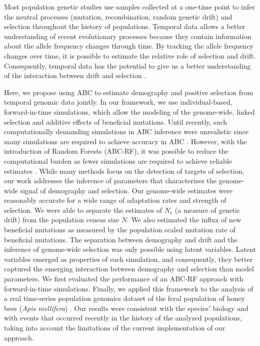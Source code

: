 \documentclass[a4paper, 12pt]{article}
\begin{document}
Most population genetic studies use samples collected at a one-time point to infer the neutral processes (mutation, recombination, random genetic drift) and selection throughout the history of populations. Temporal data allows a better understanding of recent evolutionary processes \citep[e.g.][]{Feder:2021bt, Dehasque:2020ku} because they contain information about the allele frequency changes through time. By tracking the allele frequency changes over time, it is possible to estimate the relative role of selection and drift. Consequently, temporal data has the potential to give us a better understanding of the interaction between drift and selection \citep[see for example,][]{Buffalo:2019ab, Buffalo:2020hq}. 

Here, we propose using ABC to estimate demography and positive selection from temporal genomic data jointly. In our framework, we use individual-based, forward-in-time simulations, which allow the modeling of the genome-wide, linked selection and additive effects of beneficial mutations. Until recently, such computationally demanding simulations in ABC inference were unrealistic since many simulations are required to achieve accuracy in ABC \citep{Frazier:2018kq}. However, with the introduction of Random Forests (ABC-RF), it was possible to reduce the computational burden as fewer simulations are required to achieve reliable estimates \citep{Pudlo:2016il, Raynal:2019jj}. While many methods focus on the detection of targets of selection, our work addresses the inference of parameters that characterizes the genome-wide signal of demography and selection. Our genome-wide estimates were reasonably accurate for a wide range of adaptation rates and strength of selection. We were able to separate the estimates of $N_{\mathrm{e}}$ (a measure of genetic drift) from the population census size $N$. We also estimated the influx of new beneficial mutations as measured by the population scaled mutation rate of beneficial mutations. The separation between demography and drift and the inference of genome-wide selection was only possible using latent variables. Latent variables emerged as properties of each simulation, and consequently, they better captured the emerging interaction between demography and selection than model parameters. We first evaluated the performance of an ABC-RF approach with forward-in-time simulations. Finally, we applied this framework to the analysis of a real time-series population genomics dataset of the feral population of honey bees (\textit{Apis mellifera}) \citep{Cridland:2018fx}. Our results were consistent with the species' biology and with events that occurred recently in the history of the analyzed populations, taking into account the limitations of the current implementation of our approach.
\end{document}
